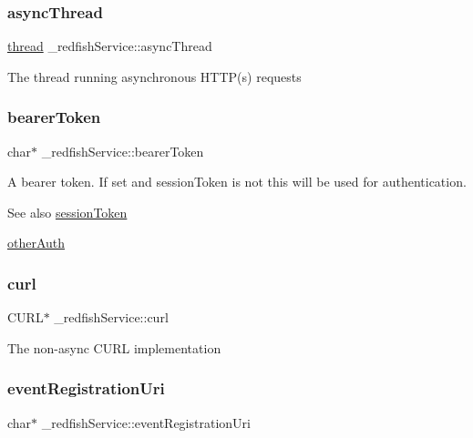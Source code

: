 \subsubsection{\texorpdfstring{async\+Thread}{asyncThread}}
{\footnotesize\ttfamily \hyperlink{queue_8h_a1ab4f928aeccce6e6996ee96a4059c8a}{thread} \+\_\+redfish\+Service\+::async\+Thread}

The thread running asynchronous H\+T\+T\+P(s) requests \mbox{\label{struct__redfishService_a3959db858c9b279bcf379fc0a5eb7419}} 
\subsubsection{\texorpdfstring{bearer\+Token}{bearerToken}}
{\footnotesize\ttfamily char$\ast$ \+\_\+redfish\+Service\+::bearer\+Token}

A bearer token. If set and session\+Token is not this will be used for authentication.

\begin{DoxySeeAlso}{See also}
\hyperlink{struct__redfishService_ac8aa0c23ac4b611dc593c86be30633bc}{session\+Token} 

\hyperlink{struct__redfishService_ac609c13e425bcdfbaaccd756c710a069}{other\+Auth} 
\end{DoxySeeAlso}
\mbox{\label{struct__redfishService_a73f37e9e9573d97909ae1b009fa00379}} 
\subsubsection{\texorpdfstring{curl}{curl}}
{\footnotesize\ttfamily C\+U\+RL$\ast$ \+\_\+redfish\+Service\+::curl}

The non-\/async C\+U\+RL implementation \mbox{\label{struct__redfishService_a875599351c18230fe9342253ed5a4941}} 
\subsubsection{\texorpdfstring{event\+Registration\+Uri}{eventRegistrationUri}}
{\footnotesize\ttfamily char$\ast$ \+\_\+redfish\+Service\+::event\+Registration\+Uri}

